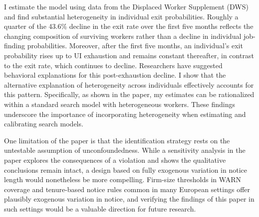 \documentclass{div}
\newcommand{\ObsHazOnetoTwo}{43.6}
\begin{document}
I estimate the model using data from the Displaced Worker Supplement (DWS) and find substantial heterogeneity in individual exit probabilities. Roughly a quarter of the \ObsHazOnetoTwo\% decline in the exit rate over the first five months reflects the changing composition of surviving workers rather than a decline in individual job-finding probabilities. Moreover, after the first five months, an individual's exit probability rises up to UI exhaustion and remains constant thereafter, in contrast to the exit rate, which continues to decline. Researchers have suggested behavioral explanations for this post-exhaustion decline. I show that the alternative explanation of heterogeneity across individuals effectively accounts for this pattern. Specifically, as shown in the paper, my estimates can be rationalized within a standard search model with heterogeneous workers. These findings underscore the importance of incorporating heterogeneity when estimating and calibrating search models.

One limitation of the paper is that the identification strategy rests on the untestable assumption of unconfoundedness. While a sensitivity analysis in the paper explores the consequences of a violation and shows the qualitative conclusions remain intact, a design based on fully exogenous variation in notice length would nonetheless be more compelling. Firm-size thresholds in WARN coverage and tenure-based notice rules common in many European settings offer plausibly exogenous variation in notice, and verifying the findings of this paper in such settings would be a valuable direction for future research.


\clearpage
{} 
 


\appendix
\setcounter{table}{0}
\setcounter{figure}{0}
\setcounter{section}{0}
\renewcommand{\thesection}{Appendix \Alph{section}}
\renewcommand{\thesubsection}{\Alph{section}.\arabic{subsection}}
\renewcommand{\theequation}{\arabic{equation}}
\renewcommand{\thetable}{\Alph{section}\arabic{table}}
\renewcommand{\thefigure}{\Alph{section}\arabic{figure}}

\setlength{\abovedisplayshortskip}{-0.15cm}
\setlength{\belowdisplayshortskip}{0.35cm}
\setlength{\abovedisplayskip}{0.35cm}
\setlength{\belowdisplayskip}{0.35cm}
\end{document}
